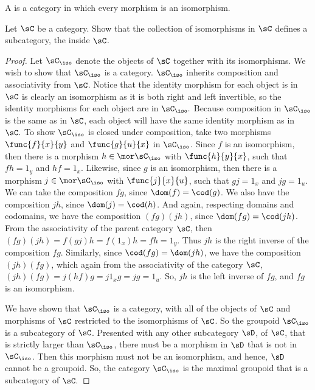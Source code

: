 \documentclass[../../main]{subfiles}
\begin{document}
\begin{definition}
	A  is a category in which every morphism is an isomorphism.
\end{definition}
\popthm

\begin{exercise}
	Let \(\sC\) be a category. Show that the collection of isomorphisms in
	\(\sC\) defines a subcategory, the  inside \(\sC\).
\end{exercise}

\begin{proof}
	Let \(\sC_{\iso}\) denote the objects of \(\sC\) together with its
	isomorphisms. We wish to show that \(\sC_{\iso}\) is a category.
	$\sC_{\iso}$ inherits composition and associativity from $\sC$.
	Notice that the identity morphism for each object
	is in $\sC$ is clearly an isomorphism as it is both right and left
	invertible, so the identity morphisms for each object are in $\sC_{\iso}.$
	Because composition in $\sC_{\iso}$ is the same as in $\sC$, each object
	will have the same identity morphism as in $\sC.$
	To show $\sC_{\iso}$ is closed under composition, take two morphisms
	\(\func{f}{x}{y}\) and \(\func{g}{u}{x}\)
	in \(\sC_{\iso}\). Since \(f\) is an isomorphism, then there is a morphism
	\(h\in\mor\sC_{\iso}\) with \(\func{h}{y}{x}\), such that \(fh=1_y\) and
	\(hf=1_x\). Likewise, since \(g\) is an isomorphism, then there is a
	morphism \(j\in\mor\sC_{\iso}\) with \(\func{j}{x}{u}\), such that \(gj=1_x\)
	and \(jg=1_u\). We can take the composition \(fg\), since
	\(\dom(f)=\cod(g)\). We also have the composition \(jh\), since
	\(\dom(j)=\cod(h)\). And again, respecting domains and codomains, we have
	the composition \((fg)(jh)\), since \(\dom(fg)=\cod(jh)\). From the
	associativity of the parent category \(\sC\), then
	\((fg)(jh)=f(gj)h=f(1_x)h=fh=1_y\). Thus \(jh\) is the right inverse of the
	composition \(fg\). Similarly, since \(\cod(fg)=\dom(jh)\), we have the
	composition \((jh)(fg)\), which again from the associativity of the category
	\(\sC\), \((jh)(fg)=j(hf)g=j1_xg=jg=1_u\). So, \(jh\) is the left inverse of
	\(fg\), and \(fg\) is an isomorphism.

	We have shown that \(\sC_{\iso}\) is a category, with all of the objects of
	\(\sC\) and morphisms of \(\sC\) restricted to the isomorphisms of \(\sC\).
	So the groupoid \(\sC_{\iso}\) is a subcategory of \(\sC\). Presented with
	any other subcategory \(\sD\), of \(\sC\), that is strictly larger than
	\(\sC_{\iso}\), there must be a morphism in \(\sD\) that is not in
	\(\sC_{\iso}\). Then this morphism must not be an isomorphism, and hence,
	\(\sD\) cannot be a groupoid. So, the category \(\sC_{\iso}\) is the maximal
	groupoid that is a subcategory of \(\sC.\)
\end{proof}
\end{document}
